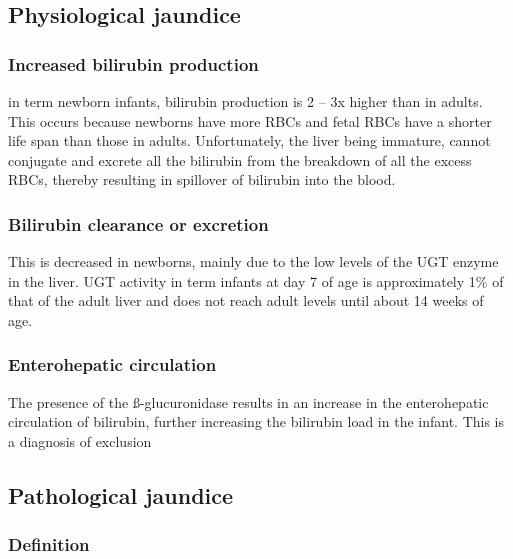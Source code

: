 \documentclass[
  letterpaper,
  DIV=11,
  numbers=noendperiod]{scrreprt}
\begin{document}
\hypertarget{physiological-jaundice}{%
\subsection{Physiological jaundice}\label{physiological-jaundice}}

\hypertarget{increased-bilirubin-production}{%
\subsubsection{Increased bilirubin
production}\label{increased-bilirubin-production}}

in term newborn infants, bilirubin production is 2 -- 3x higher than in
adults. This occurs because newborns have more RBCs and fetal RBCs have
a shorter life span than those in adults. Unfortunately, the liver being
immature, cannot conjugate and excrete all the bilirubin from the
breakdown of all the excess RBCs, thereby resulting in spillover of
bilirubin into the blood.

\hypertarget{bilirubin-clearance-or-excretion}{%
\subsubsection{Bilirubin clearance or
excretion}\label{bilirubin-clearance-or-excretion}}

This is decreased in newborns, mainly due to the low levels of the UGT
enzyme in the liver. UGT activity in term infants at day 7 of age is
approximately 1\% of that of the adult liver and does not reach adult
levels until about 14 weeks of age.

\hypertarget{enterohepatic-circulation}{%
\subsubsection{Enterohepatic
circulation}\label{enterohepatic-circulation}}

The presence of the ß-glucuronidase results in an increase in the
enterohepatic circulation of bilirubin, further increasing the bilirubin
load in the infant. This is a diagnosis of exclusion

\hypertarget{pathological-jaundice}{%
\subsection{Pathological jaundice}\label{pathological-jaundice}}

\hypertarget{definition}{%
\subsubsection{Definition}\label{definition}}
\end{document}
